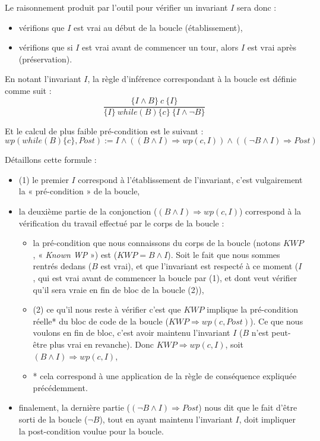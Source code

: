 Le raisonnement produit par l'outil pour vérifier un invariant $I$ sera donc :



\begin{itemize}
\item vérifions que $I$ est vrai au début de la boucle (établissement),
\item vérifions que si $I$ est vrai avant de commencer un tour, alors $I$ est vrai après (préservation).
\end{itemize}




En notant l'invariant $I$, la règle d'inférence correspondant à la boucle est 
définie comme suit :
$$\dfrac{\{I \wedge B \}\ c\ \{I\}}{\{I\}\ while(B)\{c\}\ \{I \wedge \neg B\}}$$


Et le calcul de plus faible pré-condition est le suivant :
$$wp(while (B) \{ c \}, Post) := I \wedge ((B \wedge I) \Rightarrow wp(c, I)) \wedge ((\neg B \wedge I) \Rightarrow Post)$$


Détaillons cette formule :



\begin{itemize}
\item (1) le premier $I$ correspond à l'établissement de l'invariant, c'est 
vulgairement la « pré-condition » de la boucle,
\item la deuxième partie de la conjonction ($(B \wedge I) \Rightarrow wp(c, I)$)
correspond à la vérification du travail effectué par le corps de la boucle :

\begin{itemize}
\item la pré-condition que nous connaissons du corps de la boucle (notons $KWP$,
« \textit{Known WP} ») est ($KWP = B \wedge I$). Soit le fait que nous sommes
rentrés dedans ($B$ est vrai), et que l'invariant est respecté à ce moment
($I$, qui est vrai avant de commencer la boucle par (1), et dont veut 
vérifier qu'il sera vraie en fin de bloc de la boucle (2)),
\item (2) ce qu'il nous reste à vérifier c'est que $KWP$ implique la 
pré-condition réelle* du bloc de code de la boucle 
  ($KWP \Rightarrow wp(c, Post)$). Ce que nous voulons en fin de bloc, 
  c'est avoir maintenu l'invariant $I$ ($B$ n'est peut-être plus vrai en
  revanche). Donc 
$KWP \Rightarrow wp(c, I)$, soit $(B \wedge I) \Rightarrow wp(c, I)$,
\item * cela correspond à une application de la règle de conséquence expliquée
précédemment.
\end{itemize}
\item finalement, la dernière partie ($(\neg B \wedge I) \Rightarrow Post$)
nous dit que le fait d'être sorti de la boucle ($\neg B$), tout en ayant 
maintenu l'invariant $I$, doit impliquer la post-condition voulue pour la 
boucle.
\end{itemize}


